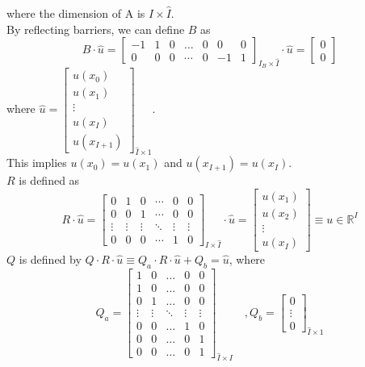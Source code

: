 \documentclass[11pt]{article}
\newcommand{\R}{\ensuremath{\mathbb{R}}}
\begin{document}
where the dimension of A is $I\times\hat{I}$.\\
By reflecting barriers, we can define $B$ as
\begin{equation}
B\cdot\hat{u} =\begin{bmatrix}
-1&1&0&\dots&0&0&0\\
0&0&0&\cdots&0&-1&1
\end{bmatrix}_{I_B\times \hat{I}}\cdot\hat{u} = \begin{bmatrix}
0\\
0
\end{bmatrix}
\end{equation}
where $\hat{u} = \begin{bmatrix}
u(x_0)\\
u(x_1)\\
\vdots\\
u(x_I)\\
u(x_{I+1})
\end{bmatrix}_{\hat{I}\times 1}$.\\
This implies $u(x_0) = u(x_1)$ and $u(x_{I+1}) = u(x_I)$.\\
$R$ is defined as 
\begin{equation}
R\cdot \hat{u} =\begin{bmatrix}
0&1&0&\cdots&0&0\\
0&0&1&\cdots&0&0\\
\vdots&\vdots&\vdots&\ddots&\vdots&\vdots\\
0&0&0&\cdots&1&0
\end{bmatrix}_{I\times\hat{I}}\cdot \hat{u}		 
=\begin{bmatrix}
u(x_1)\\
u(x_2)\\
\vdots\\
u(x_I)
\end{bmatrix} \equiv u\in \R^{I} 
\end{equation}
$Q$ is defined by $Q\cdot R\cdot\hat{u}\equiv Q_a\cdot R\cdot\hat{u}+Q_b = \hat{u}$, where 
\begin{equation}
Q_a = \begin{bmatrix}
1& 0&\dots&0&0\\
1&0&\dots&0&0\\
0&1&\dots&0&0\\
\vdots&\vdots&\ddots&\vdots&\vdots\\
0&0&\dots&1&0\\
0&0&\dots&0&1\\
0&0&\dots&0&1
\end{bmatrix}_{\hat{I}\times I}\quad , Q_b = \begin{bmatrix}
0\\
\vdots\\
0
\end{bmatrix}_{\hat{I}\times 1}
\end{equation}
\end{document}
